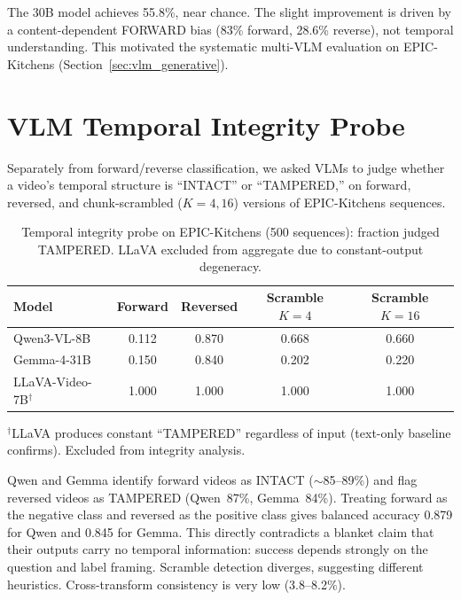 \documentclass{article}
\theoremstyle{remark}
\begin{document}
The 30B model achieves 55.8\%, near chance. The slight improvement is driven by a content-dependent FORWARD bias (83\% forward, 28.6\% reverse), not temporal understanding. This motivated the systematic multi-VLM evaluation on EPIC-Kitchens (Section~\ref{sec:vlm_generative}).

\section{VLM Temporal Integrity Probe}
\label{sec:integrity_probe}

Separately from forward/reverse classification, we asked VLMs to judge whether a video's temporal structure is ``INTACT'' or ``TAMPERED,'' on forward, reversed, and chunk-scrambled ($K\!=\!4, 16$) versions of EPIC-Kitchens sequences.

\begin{table}[h]
\centering
\caption{Temporal integrity probe on EPIC-Kitchens (500 sequences): fraction judged TAMPERED. LLaVA excluded from aggregate due to constant-output degeneracy.}
\label{tab:integrity_probe}
\begin{tabular}{lcccc}
\toprule
\textbf{Model} & \textbf{Forward} & \textbf{Reversed} & \textbf{Scramble $K\!=\!4$} & \textbf{Scramble $K\!=\!16$} \\
\midrule
Qwen3-VL-8B & 0.112 & 0.870 & 0.668 & 0.660 \\
Gemma-4-31B & 0.150 & 0.840 & 0.202 & 0.220 \\
LLaVA-Video-7B$^\dagger$ & 1.000 & 1.000 & 1.000 & 1.000 \\
\bottomrule
\end{tabular}
\begin{flushleft}
\small $^\dagger$LLaVA produces constant ``TAMPERED'' regardless of input (text-only baseline confirms). Excluded from integrity analysis.
\end{flushleft}
\end{table}

Qwen and Gemma identify forward videos as INTACT ($\sim$85--89\%) and flag reversed videos as TAMPERED (Qwen~87\%, Gemma~84\%). Treating forward as the negative class and reversed as the positive class gives balanced accuracy 0.879 for Qwen and 0.845 for Gemma. This directly contradicts a blanket claim that their outputs carry no temporal information: success depends strongly on the question and label framing. Scramble detection diverges, suggesting different heuristics. Cross-transform consistency is very low (3.8--8.2\%).
\end{document}
